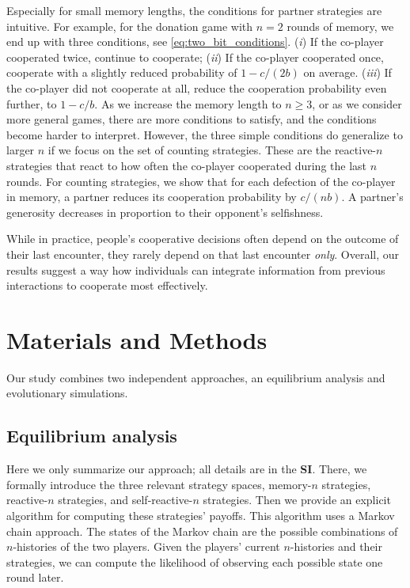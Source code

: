 \documentclass[9pt,twocolumn,twoside]{pnas-new}
\def\SI{\textbf{SI}}
\begin{document}
Especially for small memory lengths, the conditions for partner strategies are intuitive. 
For example, for the donation game with $n\!=\!2$ rounds of memory, we end up with three conditions, see \eqref{eq:two_bit_conditions}.
({\it i}) If the co-player cooperated twice, continue to cooperate; 
({\it ii}) If the co-player cooperated once, cooperate with a slightly reduced probability of $1\!-\!c/(2b)$ on average. 
({\it iii}) If the co-player did not cooperate at all, reduce the cooperation probability even further, to $1\!-\!c/b$. 
As we increase the memory length to $n\!\ge\!3$, or as we consider more general games, there are more conditions to satisfy, and the conditions become harder to interpret. 
However, the three simple conditions do generalize to larger $n$ if we focus on the set of counting strategies. 
These are the reactive-$n$ strategies that react to how often the co-player cooperated during the last $n$ rounds. 
For counting strategies, we show that for each defection of the co-player in memory, a partner reduces its cooperation probability by $c/(nb)$. 
A partner's generosity decreases in proportion to their opponent's selfishness. 

While in practice, people's cooperative decisions often depend on the outcome of their last encounter, they rarely depend on that last encounter {\it only}. 
Overall, our results suggest a way how individuals can integrate information from previous interactions to cooperate most effectively.  


\section*{Materials and Methods}\label{section:materials_and_methods}

Our study combines two independent approaches, an equilibrium analysis and evolutionary simulations.

\subsection*{Equilibrium analysis} 
Here we only summarize our approach; all details are in the \SI. 
There, we formally introduce the three relevant strategy spaces, memory-$n$ strategies, reactive-$n$ strategies, and self-reactive-$n$ strategies. 
Then we provide an explicit algorithm for computing these strategies' payoffs. 
This algorithm uses a Markov chain approach. 
The states of the Markov chain are the possible combinations of $n$-histories of the two players. 
Given the players' current $n$-histories and their strategies, we can compute the likelihood of observing each possible state one round later. 
\end{document}
